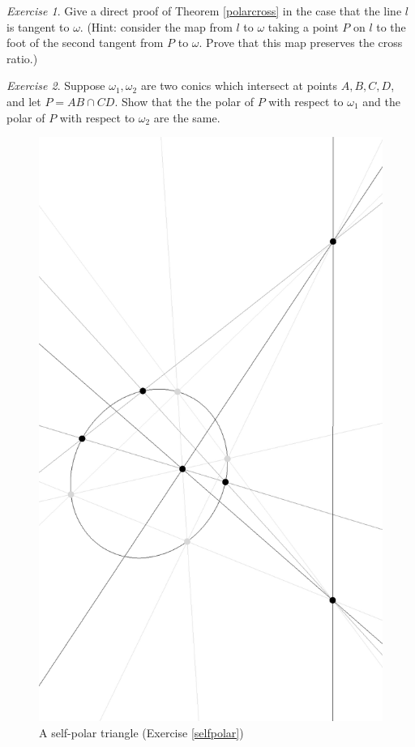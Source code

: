 \documentclass[letterpaper,11pt]{article}
\theoremstyle{definition}
\theoremstyle{remark}
\newtheorem{exer}{Exercise}
\begin{document}
\begin{exer} Give a direct proof of Theorem \ref{polarcross} in the case that the line $l$ is tangent to $\omega$. (Hint: consider the map from $l$ to $\omega$ taking a point $P$ on $l$ to the foot of the second tangent from $P$ to $\omega$. Prove that this map preserves the cross ratio.)
\end{exer}

\begin{exer} Suppose $\omega_1, \omega_2$ are two conics which intersect at points $A, B, C, D$, and let $P = AB \cap CD$. Show that the the polar of $P$ with respect to $\omega_1$ and the polar of $P$ with respect to $\omega_2$ are the same.
\end{exer}

\begin{figure}[!htb]
\centering
\includegraphics[scale=0.4,angle=270]{selfpolar.eps}
\caption{A self-polar triangle (Exercise \ref{selfpolar})}
\end{figure}
\end{document}
